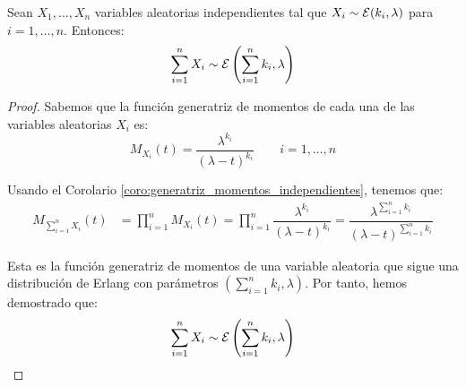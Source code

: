 \begin{prop}
    Sean $X_1, \dots, X_n$ variables aleatorias independientes tal que $X_i\sim \mathcal{E}(k_i,\lambda)$ para $i=1,\dots,n$. Entonces:
    \begin{equation*}
        \sum_{i=1}^{n}X_i \sim \mathcal{E}\left(\sum_{i=1}^{n}k_i,\lambda\right)
    \end{equation*}

    \begin{proof}
        Sabemos que la función generatriz de momentos de cada una de las variables aleatorias $X_i$ es:
        \begin{equation*}
            M_{X_i}(t) = \dfrac{\lambda^{k_i}}{(\lambda-t)^{k_i}} \qquad i=1,\dots,n
        \end{equation*}
    
        Usando el Corolario \ref{coro:generatriz_momentos_independientes}, tenemos que:
        \begin{align*}
            M_{\sum\limits_{i=1}^{n}X_i}(t) &= \prod_{i=1}^{n}M_{X_i}(t) = \prod_{i=1}^{n}\dfrac{\lambda^{k_i}}{(\lambda-t)^{k_i}} = \dfrac{\lambda^{\sum\limits_{i=1}^{n}k_i}}{(\lambda-t)^{\sum\limits_{i=1}^{n}k_i}}
        \end{align*}

        Esta es la función generatriz de momentos de una variable aleatoria que sigue una distribución de Erlang con parámetros $\left(\sum\limits_{i=1}^{n}k_i,\lambda\right)$. Por tanto, hemos demostrado que:
        \begin{equation*}
            \sum_{i=1}^{n}X_i \sim \mathcal{E}\left(\sum_{i=1}^{n}k_i,\lambda\right)
        \end{equation*}
    \end{proof}
\end{prop}

